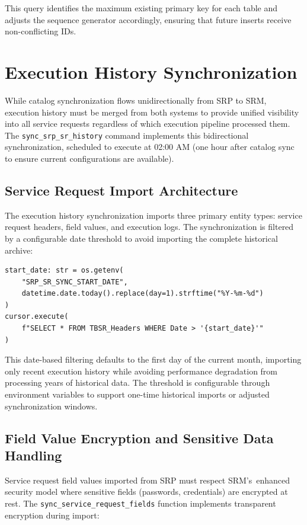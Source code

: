 This query identifies the maximum existing primary key for each table and adjusts the sequence generator accordingly, ensuring that future inserts receive non-conflicting IDs.

\section{Execution History Synchronization}

While catalog synchronization flows unidirectionally from SRP to SRM, execution history must be merged from both systems to provide unified visibility into all service requests regardless of which execution pipeline processed them. The \texttt{sync\_srp\_sr\_history} command implements this bidirectional synchronization, scheduled to execute at 02:00 AM (one hour after catalog sync to ensure current configurations are available).

\subsection{Service Request Import Architecture}

The execution history synchronization imports three primary entity types: service request headers, field values, and execution logs. The synchronization is filtered by a configurable date threshold to avoid importing the complete historical archive:

\begin{verbatim}
start_date: str = os.getenv(
    "SRP_SR_SYNC_START_DATE",
    datetime.date.today().replace(day=1).strftime("%Y-%m-%d")
)
cursor.execute(
    f"SELECT * FROM TBSR_Headers WHERE Date > '{start_date}'"
)
\end{verbatim}

This date-based filtering defaults to the first day of the current month, importing only recent execution history while avoiding performance degradation from processing years of historical data. The threshold is configurable through environment variables to support one-time historical imports or adjusted synchronization windows.

\subsection{Field Value Encryption and Sensitive Data Handling}

Service request field values imported from SRP must respect SRM's~enhanced security model where sensitive fields (passwords, credentials) are encrypted at rest. The \texttt{sync\_service\_request\_fields} function implements transparent encryption during import:

